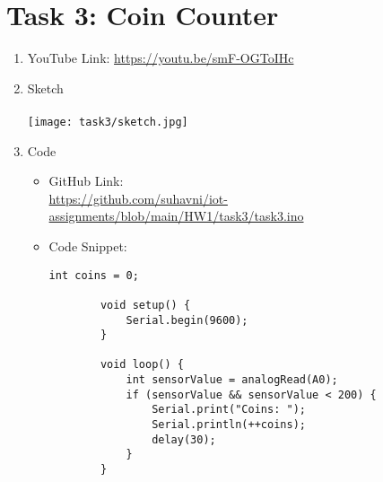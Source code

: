 \documentclass[12pt]{article}
\begin{document}
\section*{Task 3: Coin Counter}
\begin{enumerate}
	\item YouTube Link: \href{https://youtu.be/smF-OGToIHc}{https://youtu.be/smF-OGToIHc}
	\item Sketch \\\\
		\texttt{[image: task3/sketch.jpg]}
	\item Code
		\begin{itemize}
			\item GitHub Link:\\ 
				\href{https://github.com/suhavni/iot-assignments/blob/main/HW1/task3/task3.ino}{https://github.com/suhavni/iot-assignments/blob/main/HW1/task3/task3.ino}
			\newpage
			\item Code Snippet:
				\begin{lstlisting}[language=Arduino]
		int coins = 0;

		void setup() {
			Serial.begin(9600);
		}
		
		void loop() {
			int sensorValue = analogRead(A0);
			if (sensorValue && sensorValue < 200) {
				Serial.print("Coins: ");
				Serial.println(++coins);
				delay(30);
			}
		}
				\end{lstlisting}
	\end{itemize}
\end{enumerate}
\end{document}
